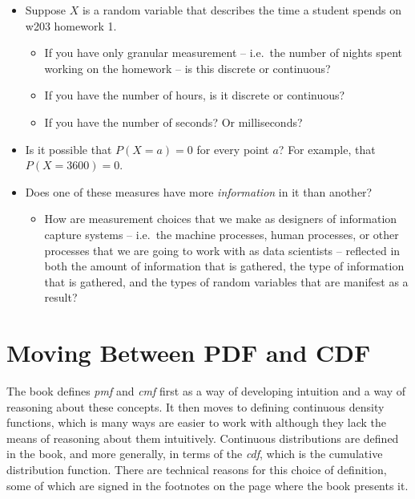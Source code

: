 \documentclass[
]{book}
\providecommand{\tightlist}{%
  \setlength{\itemsep}{0pt}\setlength{\parskip}{0pt}}
\theoremstyle{definition}
\theoremstyle{definition}
\theoremstyle{definition}
\theoremstyle{definition}
\theoremstyle{remark}
\begin{document}
\begin{itemize}
\tightlist
\item
  Suppose \(X\) is a random variable that describes the time a student spends on w203 homework 1.

  \begin{itemize}
  \tightlist
  \item
    If you have only granular measurement -- i.e.~the number of nights spent working on the homework -- is this discrete or continuous?
  \item
    If you have the number of hours, is it discrete or continuous?
  \item
    If you have the number of seconds? Or milliseconds?
  \end{itemize}
\item
  Is it possible that \(P(X = a) = 0\) for every point \(a\)? For example, that \(P(X = 3600) = 0\).
\item
  Does one of these measures have more \emph{information} in it than another?

  \begin{itemize}
  \tightlist
  \item
    How are measurement choices that we make as designers of information capture systems -- i.e.~the machine processes, human processes, or other processes that we are going to work with as data scientists -- reflected in both the amount of information that is gathered, the type of information that is gathered, and the types of random variables that are manifest as a result?
  \end{itemize}
\end{itemize}

\section{Moving Between PDF and CDF}\label{moving-between-pdf-and-cdf}

The book defines \emph{pmf} and \emph{cmf} first as a way of developing intuition and a way of reasoning about these concepts. It then moves to defining continuous density functions, which is many ways are easier to work with although they lack the means of reasoning about them intuitively. Continuous distributions are defined in the book, and more generally, in terms of the \emph{cdf}, which is the cumulative distribution function. There are technical reasons for this choice of definition, some of which are signed in the footnotes on the page where the book presents it.
\end{document}
